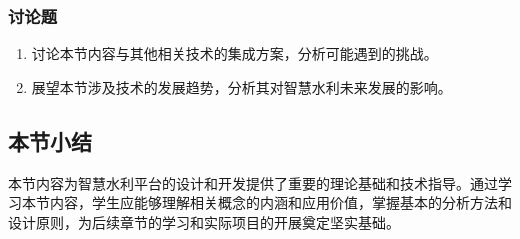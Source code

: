 \subsubsection{讨论题}\label{ux8ba8ux8bbaux9898-2} \begin{enumerate} \def\labelenumi{\arabic{enumi}.} \tightlist \item
讨论本节内容与其他相关技术的集成方案，分析可能遇到的挑战。 \item 展望本节涉及技术的发展趋势，分析其对智慧水利未来发展的影响。 \end{enumerate}
\subsection{本节小结}\label{ux672cux8282ux5c0fux7ed3-2}
本节内容为智慧水利平台的设计和开发提供了重要的理论基础和技术指导。通过学习本节内容，学生应能够理解相关概念的内涵和应用价值，掌握基本的分析方法和设计原则，为后续章节的学习和实际项目的开展奠定坚实基础。
